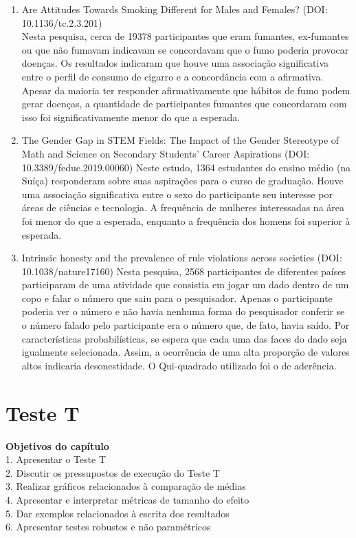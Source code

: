 \documentclass[
]{book}
\begin{document}
\begin{enumerate}
\def\labelenumi{\arabic{enumi}.}
\item
  Are Attitudes Towards Smoking Different for Males and Females? (DOI:
  10.1136/tc.2.3.201)\\
  Nesta pesquisa, cerca de 19378 participantes que eram fumantes,
  ex-fumantes ou que não fumavam indicavam se concordavam que o fumo
  poderia provocar doenças. Os resultados indicaram que houve uma
  associação significativa entre o perfil de consumo de cigarro e a
  concordância com a afirmativa. Apesar da maioria ter responder
  afirmativamente que hábitos de fumo podem gerar doenças, a quantidade
  de participantes fumantes que concordaram com isso foi
  significativamente menor do que a esperada.
\item
  The Gender Gap in STEM Fields: The Impact of the Gender Stereotype of
  Math and Science on Secondary Students' Career Aspirations (DOI:
  10.3389/feduc.2019.00060) Neste estudo, 1364 estudantes do ensino
  médio (na Suíça) responderam sobre suas aspirações para o curso de
  graduação. Houve uma associação significativa entre o sexo do
  participante seu interesse por áreas de ciências e tecnologia. A
  frequência de mulheres interessadas na área foi menor do que a
  esperada, enquanto a frequência dos homens foi superior à esperada.
\item
  Intrinsic honesty and the prevalence of rule violations across
  societies (DOI: 10.1038/nature17160) Nesta pesquisa, 2568
  participantes de diferentes países participaram de uma atividade que
  consistia em jogar um dado dentro de um copo e falar o número que saiu
  para o pesquisador. Apenas o participante poderia ver o número e não
  havia nenhuma forma do pesquisador conferir se o número falado pelo
  participante era o número que, de fato, havia saído. Por
  características probabilísticas, se espera que cada uma das faces do
  dado seja igualmente selecionada. Assim, a ocorrência de uma alta
  proporção de valores altos indicaria desonestidade. O Qui-quadrado
  utilizado foi o de aderência.
\end{enumerate}

\hypertarget{teste-t}{%
\chapter{Teste T}\label{teste-t}}

\begin{objectives}
\textbf{Objetivos do capítulo}\\
1. Apresentar o Teste T\\
2. Discutir os pressupostos de execução do Teste T\\
3. Realizar gráficos relacionados à comparação de médias\\
4. Apresentar e interpretar métricas de tamanho do efeito\\
5. Dar exemplos relacionados à escrita dos resultados\\
6. Apresentar testes robustos e não paramétricos
\end{objectives}
\end{document}
